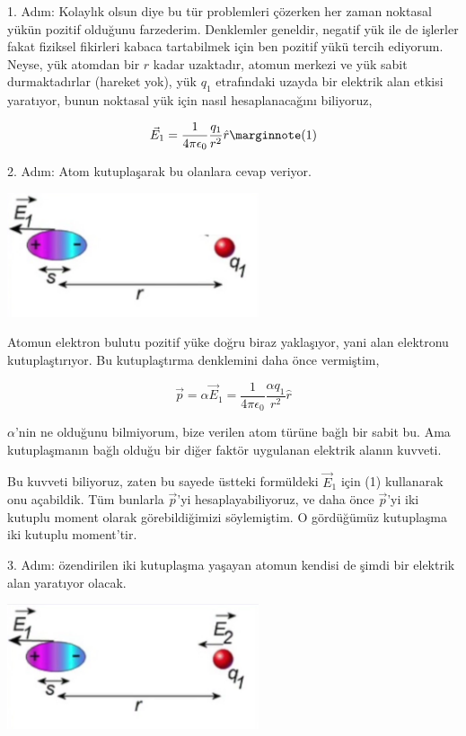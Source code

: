 \documentclass[12pt,fleqn]{article}\usepackage{../../common}
\begin{document}
1. Adım: Kolaylık olsun diye bu tür problemleri çözerken her zaman noktasal
yükün pozitif olduğunu farzederim. Denklemler geneldir, negatif yük ile de
işlerler fakat fiziksel fikirleri kabaca tartabilmek için ben pozitif yükü
tercih ediyorum. Neyse, yük atomdan bir $r$ kadar uzaktadır, atomun merkezi ve
yük sabit durmaktadırlar (hareket yok), yük $q_1$ etrafındaki uzayda bir
elektrik alan etkisi yaratıyor, bunun noktasal yük için nasıl hesaplanacağını
biliyoruz, 

$$ 
\vec{E}_1 = \frac{1}{4\pi\epsilon_0} \frac{q_1}{r^2}\hat{r} 
\mlabel{1}
$$

2. Adım: Atom kutuplaşarak bu olanlara cevap veriyor.

\includegraphics[width=20em]{03_15.png}

Atomun elektron bulutu pozitif yüke doğru biraz yaklaşıyor, yani alan elektronu
kutuplaştırıyor. Bu kutuplaştırma denklemini daha önce vermiştim, 

$$
\vec{p} = \alpha \vec{E}_1 =
\frac{1}{4\pi\epsilon_0} \frac{\alpha q_1}{r^2}\hat{r}
$$

$\alpha$'nin ne olduğunu bilmiyorum, bize verilen atom türüne bağlı bir sabit
bu. Ama kutuplaşmanın bağlı olduğu bir diğer faktör uygulanan elektrik alanın
kuvveti.

Bu kuvveti biliyoruz, zaten bu sayede üstteki formüldeki $\vec{E}_1$ için (1)
kullanarak onu açabildik. Tüm bunlarla $\vec{p}$'yi hesaplayabiliyoruz, ve daha
önce $\vec{p}$'yi iki kutuplu moment olarak görebildiğimizi söylemiştim. O
gördüğümüz kutuplaşma iki kutuplu moment'tir.

3. Adım: özendirilen iki kutuplaşma yaşayan atomun kendisi de şimdi bir elektrik
alan yaratıyor olacak. 

\includegraphics[width=20em]{03_16.png}
\end{document}
